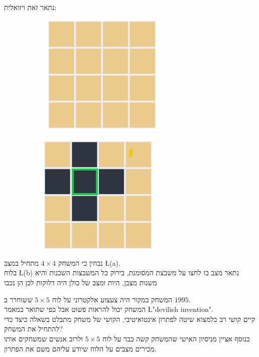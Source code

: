 \documentclass[12pt,twoside]{article}
\begin{document}
נתאר זאת ויזואלית: 

\begin{figure}[ht]
    \begin{subfigure}{.5\textwidth}
        \unsethebrew
        \caption{}
        \centering
        \includegraphics{images/4x4_start_board.PNG}
        \sethebrew
    \end{subfigure}%
    \begin{subfigure}{.5\textwidth}
        \unsethebrew
        \caption{}
        \centering
        \includegraphics{images/4x4_press.PNG}
        \sethebrew
    \end{subfigure}%
\end{figure}

נבחין כי המשחק 
$4 \times 4$
מתחיל במצב
\L{(a)}.
\\
בלוח 
\L{(b)}
נתאר מצב בו לחצו על משבצת המסומנת, בירוק
כל המשבצות השכנות והיא משנות מצבן, היות ומצב של כולן היה דלוקות לכן הן נכבו

המשחק במקור היה צעצוע אלקטרוני על לוח 
$5 \times 5$
ששוחרר ב 
$1995$.
\\
המשחק יכול להראות פשוט אבל כפי שתואר
במאמר
\cite{B1}
\L{"devilish invention"}.
\\
קיים קושי רב בלמצוא שיטה לפתרון אינטואיטיבי, הקושי של משחק מתבלט בשאלה כיצד כדי להתחיל את המשחק?
\\
בנוסף אציין מניסיון האישי שהמשחק קשה כבר 
על לוח 
$5 \times 5$
ולרוב אנשים שמשחקים אותו מכירים מצבים על הלוח שיודע עליהם משם את הפתרון.
\end{document}
